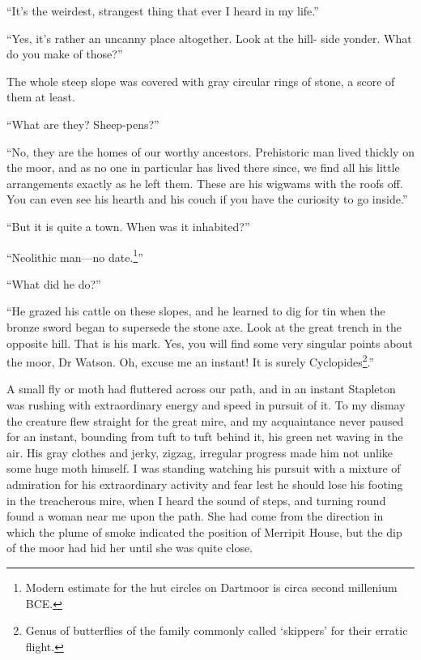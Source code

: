 \documentclass[paper=5.5in:8.5in,BCOR=7mm,twoside,DIV=calc,12pt,usegeometry,openany,chapterprefix,endperiod,headings=big]{scrbook} %
\begin{document}
\enquote{It's the weirdest, strangest thing that ever I heard in my life.}

\enquote{Yes, it's rather an uncanny place altogether. Look at the hill- side yonder. What do you make of those?}

The whole steep slope was covered with gray circular rings of stone, a score of them at least.

\enquote{What are they? Sheep-pens?}

\enquote{No, they are the homes of our worthy ancestors. Prehistoric man lived thickly on the moor, and as no one in particular has lived there since, we find all his little arrangements exactly as he left them. These are his wigwams with the roofs off. You can even see his hearth and his couch if you have the curiosity to go inside.}

\enquote{But it is quite a town. When was it inhabited?}

\enquote{Neolithic man---no date.\footnote{Modern estimate for the hut circles on Dartmoor is circa second millenium BCE.}}

\enquote{What did he do?}

\enquote{He grazed his cattle on these slopes, and he learned to dig for tin when the bronze sword began to supersede the stone axe. Look at the great trench in the opposite hill. That is his mark. Yes, you will find some very singular points about the moor, Dr Watson. Oh, excuse me an instant! It is surely Cyclopides\footnote{Genus of butterflies of the family commonly called \enquote{skippers} for their erratic flight.}.}


A small fly or moth had fluttered across our path, and in an instant Stapleton was rushing with extraordinary energy and speed in pursuit of it. To my dismay the creature flew straight for the great mire, and my acquaintance never paused for an instant, \newline bounding from tuft to tuft behind it, his green net waving in the air. His gray clothes and jerky, zigzag, irregular progress made him not unlike some huge moth himself. I was standing watching his pursuit with a mixture of admiration for his extraordinary activity and fear lest he should lose his footing in the treacherous mire, when I heard the sound of steps, and turning round found a woman near me upon the path. She had come from the direction in which the plume of smoke indicated the position of Merripit House, but the dip of the moor had hid her until she was quite close.
\end{document}
